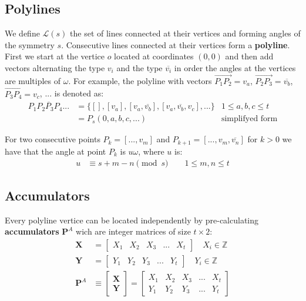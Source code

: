 \documentclass[11pt]{article}
\begin{document}
\subsection{Polylines}

We define $\mathcal{L}(s)$ the set of lines connected at their vertices and forming angles of the symmetry $s$. Consecutive lines connected at their vertices form a \textbf{polyline}. First we start at the vertice $o$ located at coordinates $(0,0)$ and then add vectors alternating the type $v_i$ and the type $\overline{v_i}$ in order the angles at the vertices are multiples of $\omega$. For example, the polyline with vectors $\overrightarrow{P_1P_2}=v_a$, $\overrightarrow{P_2P_3}=\overline{v_b}$, $\overrightarrow{P_3P_4}=v_c$, ... is denoted as:
\begin{align}
\overline{P_1P_2P_3P_4...} &= \{ [], [v_a], [v_a,\overline{v_b}],[v_a,\overline{v_b},v_c],... \} 
 & 1 \leq a,b,c \leq t \\
 &= P_s(0,a,b,c,...) & \mbox{simplifyed form}
\end{align}

For two consecutive points $P_k = [...,v_m]$ and $P_{k+1} = [...,v_m,\overline{v_n}]$ for $k>0$ we have that the angle at point $P_k$ is $u\omega$, where $u$ is:
\begin{align}
u &\equiv s + m - n \pmod{s} \quad  \quad 1 \leq m,n \leq t \label{eq:angle}
\end{align}

\subsection{Accumulators}

Every polyline vertice can be located independently by pre-calculating \textbf{accumulators} $\textbf{P}^A$ wich are integer matrices of size $t\times 2$:
\begin{align}
\textbf{X} &= \left[\begin{array}{ccccc}X_1&X_2&X_3&...&X_t
 \end{array}\right]  \quad X_i \in \mathbb{Z}\\
\textbf{Y} &= \left[\begin{array}{ccccc}Y_1&Y_2&Y_3&...&Y_t
 \end{array}\right]  \quad Y_i \in \mathbb{Z}\\
\textbf{P}^A &\equiv \left[\begin{array}{c}\textbf{X} \\ \textbf{Y}
 \end{array}\right]
 = \left[\begin{array}{ccccc}X_1&X_2&X_3&...&X_t
  \\ Y_1&Y_2&Y_3&...&Y_t \end{array}\right] \label{eq:accums}
\end{align}
\end{document}
